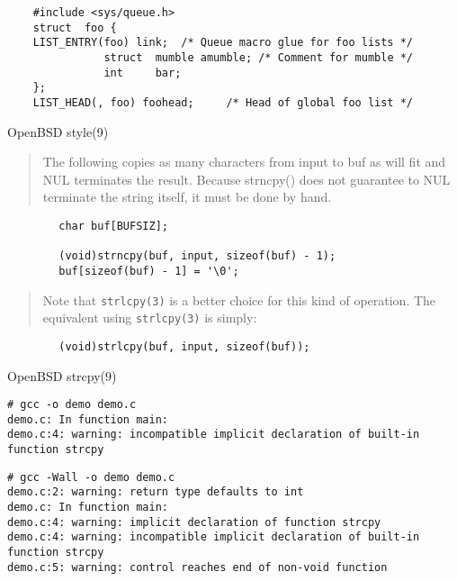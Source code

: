 \documentclass[Screen16to9,17pt]{foils}
\begin{document}
\begin{verbatim}
    #include <sys/queue.h>
    struct  foo {
    LIST_ENTRY(foo) link;  /* Queue macro glue for foo lists */
               struct  mumble amumble; /* Comment for mumble */
               int     bar;
    };
    LIST_HEAD(, foo) foohead;     /* Head of global foo list */
\end{verbatim}


OpenBSD style(9)


\begin{quote}
The following copies as many characters from input to buf as will fit and
NUL terminates the result.  Because strncpy() does not guarantee to NUL
terminate the string itself, it must be done by hand.
\end{quote}

\begin{verbatim}
        char buf[BUFSIZ];

        (void)strncpy(buf, input, sizeof(buf) - 1);
        buf[sizeof(buf) - 1] = '\0';
\end{verbatim}

\begin{quote}
Note that \verb+strlcpy(3)+ is a better choice for this kind of operation.  The
equivalent using \verb+strlcpy(3)+ is simply:
\end{quote}
\begin{verbatim}
        (void)strlcpy(buf, input, sizeof(buf));
\end{verbatim}

OpenBSD strcpy(9)


\begin{verbatim}
# gcc -o demo demo.c
demo.c: In function main:
demo.c:4: warning: incompatible implicit declaration of built-in
function strcpy
\end{verbatim}

\begin{verbatim}
# gcc -Wall -o demo demo.c
demo.c:2: warning: return type defaults to int
demo.c: In function main:
demo.c:4: warning: implicit declaration of function strcpy
demo.c:4: warning: incompatible implicit declaration of built-in
function strcpy
demo.c:5: warning: control reaches end of non-void function
\end{verbatim}
\end{document}
